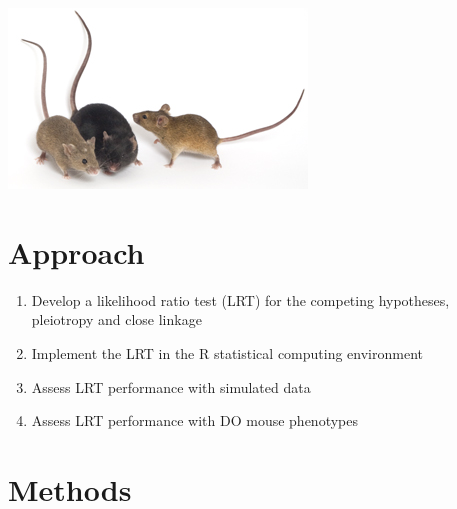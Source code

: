 \documentclass[a0,landscape]{a0poster}
\begin{document}
\begin{multicols}{4}
\begin{center}\vspace{1cm}
\includegraphics[width=0.8\linewidth]{009376}
\end{center}\vspace{1cm}



\color{DarkSlateGray} %

\section*{Approach}

\begin{enumerate}
\item Develop a likelihood ratio test (LRT) for the competing hypotheses, pleiotropy and close linkage
\item Implement the LRT in the R statistical computing environment 
\item Assess LRT performance with simulated data
\item Assess LRT performance with DO mouse phenotypes
\end{enumerate}


\section*{Methods}


\end{multicols}
\end{document}
